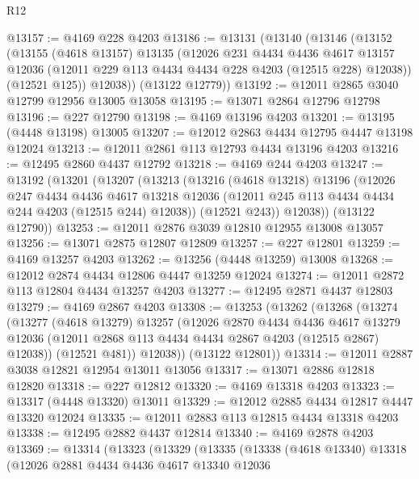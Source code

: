 \begin{lexlean}{R12}
\begin{coremodule}
@13157 := @4169 @228 @4203
@13186 := @13131
    (@13140
      (@13146
        (@13152
          (@13155
            (@4618 @13157)
            @13135
            (@12026
              @231
              @4434
              @4436
              @4617
              @13157
              @12036
              (@12011 @229 @113 @4434 @4434 @228 @4203 (@12515 @228) @12038))
            (@12521 @125))
          @12038))
      (@13122 @12779))
@13192 := @12011 @2865 @3040 @12799 @12956 @13005 @13058
@13195 := @13071 @2864 @12796 @12798
@13196 := @227 @12790
@13198 := @4169 @13196 @4203
@13201 := @13195 (@4448 @13198) @13005
@13207 := @12012 @2863 @4434 @12795 @4447 @13198 @12024
@13213 := @12011 @2861 @113 @12793 @4434 @13196 @4203
@13216 := @12495 @2860 @4437 @12792
@13218 := @4169 @244 @4203
@13247 := @13192
    (@13201
      (@13207
        (@13213
          (@13216
            (@4618 @13218)
            @13196
            (@12026
              @247
              @4434
              @4436
              @4617
              @13218
              @12036
              (@12011 @245 @113 @4434 @4434 @244 @4203 (@12515 @244) @12038))
            (@12521 @243))
          @12038))
      (@13122 @12790))
@13253 := @12011 @2876 @3039 @12810 @12955 @13008 @13057
@13256 := @13071 @2875 @12807 @12809
@13257 := @227 @12801
@13259 := @4169 @13257 @4203
@13262 := @13256 (@4448 @13259) @13008
@13268 := @12012 @2874 @4434 @12806 @4447 @13259 @12024
@13274 := @12011 @2872 @113 @12804 @4434 @13257 @4203
@13277 := @12495 @2871 @4437 @12803
@13279 := @4169 @2867 @4203
@13308 := @13253
    (@13262
      (@13268
        (@13274
          (@13277
            (@4618 @13279)
            @13257
            (@12026
              @2870
              @4434
              @4436
              @4617
              @13279
              @12036
              (@12011 @2868 @113 @4434 @4434 @2867 @4203 (@12515 @2867) @12038))
            (@12521 @481))
          @12038))
      (@13122 @12801))
@13314 := @12011 @2887 @3038 @12821 @12954 @13011 @13056
@13317 := @13071 @2886 @12818 @12820
@13318 := @227 @12812
@13320 := @4169 @13318 @4203
@13323 := @13317 (@4448 @13320) @13011
@13329 := @12012 @2885 @4434 @12817 @4447 @13320 @12024
@13335 := @12011 @2883 @113 @12815 @4434 @13318 @4203
@13338 := @12495 @2882 @4437 @12814
@13340 := @4169 @2878 @4203
@13369 := @13314
    (@13323
      (@13329
        (@13335
          (@13338
            (@4618 @13340)
            @13318
            (@12026
              @2881
              @4434
              @4436
              @4617
              @13340
              @12036

\end{coremodule}
\end{lexlean}
